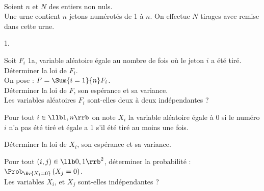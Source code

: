 \documentclass[11pt]{article}%
\begin{document}
\begin{exerciceSP}~\\
  Soient $n$ et $N$ des entiers non nuls. \\
  Une urne contient $n$ jetons numérotés de 1 à $n$. On effectue
  $N$ tirages avec remise dans cette urne.
  \begin{noliste}{1.}
    \setlength{\itemsep}{2mm}
  \item Soit $F_{i}$ 1a, variable aléatoire égale au nombre de fois où
    le jeton $i$ a été tiré.\\
    Déterminer la loi de $F_{i}$.\\[.2cm]
    On pose : $F = \Sum{i=1}{n}F_{i}$.\\
    Déterminer la loi de $F$, son espérance et sa variance.\\
    Les variables aléatoires $F_{i}$ sont-elles deux à deux
    indépendantes ?

  \item Pour tout $i\in \llb 1,n \rrb$ on note
    $X_{i}$ la variable aléatoire égale à $0$ si le numéro $i$ n'a
    pas été tiré et égale a 1 s'il été tiré au moins une fois.

    Déterminer la loi de $X_{i}$, son espérance et sa variance.

    Pour tout $\left( i,j\right) \in \llb 0,1\rrb^{2}$, déterminer la
    probabilité : $\Prob_{\Ev{X_{i}=0}} \left( X_{j}=0\right)$.\\
    Les variables $X_{i}$, et $X_{j}$ sont-elles indépendantes ?
  \end{noliste}
\end{exerciceSP}


\newpage
\end{document}
